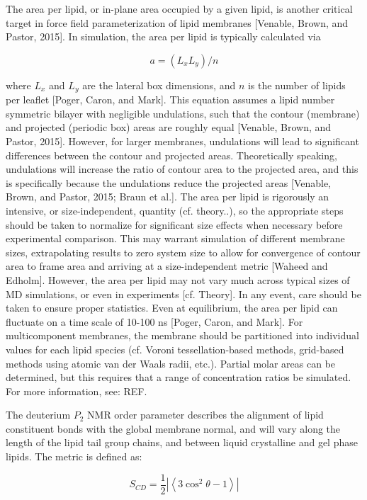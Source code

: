 \documentclass[9pt,bestpractices]{livecoms}
\begin{document}
The area per lipid, or in-plane area occupied by a given lipid, is another critical target in force field parameterization of lipid membranes [Venable, Brown, and Pastor, 2015].
In simulation, the area per lipid is typically calculated via

\begin{equation}
	\label{e:partition}
	a=(L_x L_y)/n
\end{equation}

where $L_x$ and $L_y$ are the lateral box dimensions, and $n$ is the number of lipids per leaflet [Poger, Caron, and Mark].
This equation assumes a lipid number symmetric bilayer with negligible undulations, such that the contour (membrane) and projected (periodic box) areas are roughly equal [Venable, Brown, and Pastor, 2015].
However, for larger membranes, undulations will lead to significant differences between the contour and projected areas.
Theoretically speaking, undulations will increase the ratio of contour area to the projected area, and this is specifically because the undulations reduce the projected areas [Venable, Brown, and Pastor, 2015; Braun et al.].
The area per lipid is rigorously an intensive, or size-independent, quantity (cf. theory..), so the appropriate steps should be taken to normalize for significant size effects when necessary before experimental comparison.
This may warrant simulation of different membrane sizes, extrapolating results to zero system size to allow for convergence of contour area to frame area and arriving at a size-independent metric [Waheed and Edholm].
However, the area per lipid may not vary much across typical sizes of MD simulations, or even in experiments [cf. Theory].
In any event, care should be taken to ensure proper statistics.
Even at equilibrium, the area per lipid can fluctuate on a time scale of 10-100 ns [Poger, Caron, and Mark].
For multicomponent membranes, the membrane should be partitioned into individual values for each lipid species (cf. Voroni tessellation-based methods, grid-based methods using atomic van der Waals radii, etc.).
Partial molar areas can be determined, but this requires that a range of concentration ratios be simulated.
For more information, see: REF.

The deuterium $P_2$ NMR order parameter describes the alignment of lipid constituent bonds with the global membrane normal, and will vary along the length of the lipid tail group chains, and between liquid crystalline and gel phase lipids.
The metric is defined as:

\begin{equation}
	\label{e:partition}
	S_{CD}=\frac{1}{2} \left | \left<3\cos^2\theta-1 \right>\right|
\end{equation}
\end{document}
